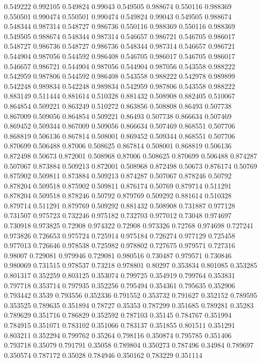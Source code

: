 0.549222 0.992105
0.549824 0.99043
0.549505 0.988674
0.550116 0.988369
0.550501 0.990474
0.550501 0.990474
0.549824 0.99043
0.549505 0.988674
0.548344 0.987314
0.548727 0.986736
0.550116 0.988369
0.550116 0.988369
0.549505 0.988674
0.548344 0.987314
0.546657 0.986721
0.546705 0.986017
0.548727 0.986736
0.548727 0.986736
0.548344 0.987314
0.546657 0.986721
0.544904 0.987056
0.544592 0.986408
0.546705 0.986017
0.546705 0.986017
0.546657 0.986721
0.544904 0.987056
0.544904 0.987056
0.543558 0.988222
0.542959 0.987806
0.544592 0.986408
0.543558 0.988222
0.542978 0.989899
0.542248 0.989834
0.542248 0.989834
0.542959 0.987806
0.543558 0.988222
0.883149 0.511444
0.881614 0.510328
0.881432 0.508908
0.882405 0.510067
0.864854 0.509221
0.863249 0.510272
0.863856 0.508808
0.86493 0.507738
0.867009 0.509056
0.864854 0.509221
0.86493 0.507738
0.866634 0.507469
0.869452 0.509344
0.867009 0.509056
0.866634 0.507469
0.868551 0.507706
0.868819 0.506136
0.867814 0.508001
0.869452 0.509344
0.868551 0.507706
0.870699 0.506488
0.87006 0.508625
0.867814 0.508001
0.868819 0.506136
0.872498 0.50673
0.872001 0.508968
0.87006 0.508625
0.870699 0.506488
0.874287 0.507067
0.873884 0.509213
0.872001 0.508968
0.872498 0.50673
0.876174 0.50769
0.875902 0.509811
0.873884 0.509213
0.874287 0.507067
0.878246 0.50792
0.878204 0.509518
0.875902 0.509811
0.876174 0.50769
0.879714 0.511291
0.878204 0.509518
0.878246 0.50792
0.879769 0.509292
0.881614 0.510328
0.879714 0.511291
0.879769 0.509292
0.881432 0.508908
0.731887 0.977128
0.731507 0.975723
0.732246 0.975182
0.732703 0.977012
0.73048 0.974697
0.730918 0.973825
0.72908 0.974322
0.72908 0.973326
0.72768 0.974698
0.727241 0.973826
0.726653 0.975724
0.725914 0.975184
0.726274 0.977129
0.725458 0.977013
0.726646 0.978538
0.725982 0.978802
0.727675 0.979571
0.727316 0.98007
0.729081 0.979946
0.729081 0.980516
0.730487 0.979571
0.730846 0.980069
0.731515 0.978537
0.73218 0.978801
0.80297 0.353834
0.801085 0.353285
0.801317 0.352259
0.803125 0.353074
0.799725 0.354919
0.799764 0.353831
0.797718 0.353714
0.797935 0.352256
0.795494 0.354361
0.795635 0.352906
0.793442 0.3539
0.793556 0.352336
0.791552 0.353732
0.791627 0.352152
0.789595 0.353525
0.789635 0.351894
0.78727 0.35353
0.787299 0.351685
0.789281 0.35283
0.789629 0.351716
0.786829 0.352592
0.787103 0.35145
0.784767 0.351994
0.784915 0.351071
0.783102 0.351066
0.783137 0.351855
0.801511 0.351291
0.803211 0.352294
0.799762 0.35264
0.798116 0.350874
0.795785 0.351406
0.793718 0.35079
0.791791 0.35058
0.789804 0.350273
0.787496 0.34984
0.789697 0.350574
0.787172 0.35028
0.784946 0.350162
0.783229 0.351114
